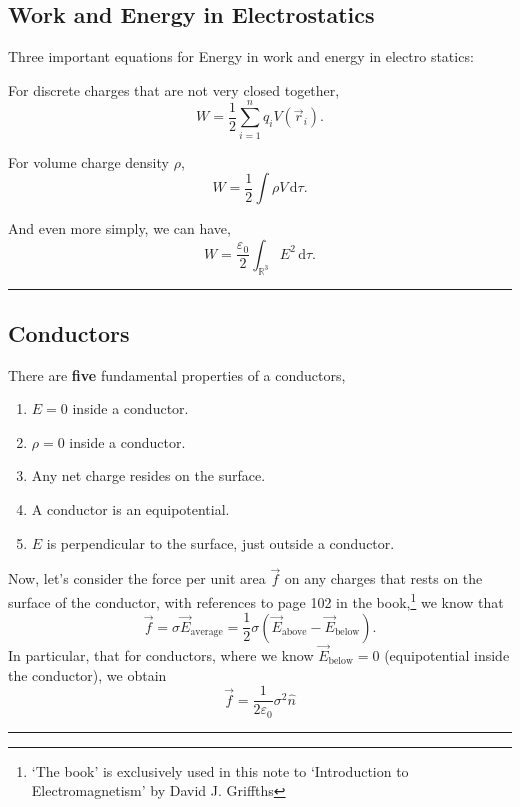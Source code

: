 \documentclass[a4paper]{article}
\newcommand{\dmr}[1]{\, \mathrm{d}#1} %
\numberwithin{equation}{subsection}
\begin{document}
\subsection{Work and Energy in Electrostatics}
Three important equations for Energy in work and energy in electro statics:
\par For discrete charges that are not very closed together,
\begin{equation}
    W = \frac{1}{2} \sum_{i = 1}^{n}q_i V(\vec{r}_i).
\end{equation}
\par For volume charge density $\rho$, 
\begin{equation}
    W = \frac12 \int \rho V \dmr{\tau}.
\end{equation}
\par And even more simply, we can have,
\begin{equation}
    W = \frac{\varepsilon_0}{2}\int_{\mathbb{R}^3}E^2\dmr{\tau}.
\end{equation}

\par\noindent\rule{\textwidth}{0.4pt}
\subsection{Conductors}
There are \textbf{five} fundamental properties of a conductors,
\begin{enumerate}
    \item $E = 0$ inside a conductor.
    \item $\rho = 0$ inside a conductor.
    \item Any net charge resides on the surface.
    \item A conductor is an equipotential.
    \item $E$ is perpendicular to the surface, just outside a conductor.
\end{enumerate}

Now, let's consider the force per unit area $\vec{f}$ on any charges that rests on the surface of the conductor, with references to page 102 in the book,\footnote{`The book' is exclusively used in this note to `Introduction to Electromagnetism' by David J. Griffths} we know that
\begin{equation}
    \vec{f} = \sigma \vec{E}_{\text{average}} = \frac12 \sigma (\vec{E}_{\text{above}}-\vec{E}_{\text{below}}).
\end{equation}
In particular, that for conductors, where we know $\vec{E}_{\text{below}} = 0$ (equipotential inside the conductor), we obtain 
\begin{equation}
    \vec{f} = \frac{1}{2\varepsilon_0}\sigma^2 \hat{n}
\end{equation} 
\par\noindent\rule{\textwidth}{0.4pt}
\end{document}
